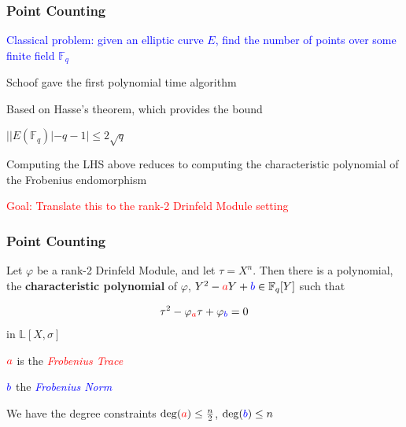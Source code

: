 \documentclass{beamer}
\newcommand{\blue}{\textcolor{blue}}
\newcommand{\red}{\textcolor{red}}
\newcommand{\spa}{\vspace{0.2cm}}
\begin{document}

\begin{frame}
\frametitle{Point Counting}


 \blue{Classical problem: given an elliptic curve $E$, find the number of points over some finite field $\mathbb{F}_q$} 
 
 \spa
 
Schoof gave the first polynomial time algorithm

\spa

Based on Hasse's theorem, which provides the bound 

\centerline {$ | |E(\mathbb{F}_q)| - q - 1  | \leq 2 \sqrt{q} $}

\spa

 Computing the LHS above reduces to computing the characteristic polynomial of the Frobenius endomorphism
 
 \spa
\red{Goal: Translate this to the rank-2 Drinfeld Module setting}


\end{frame}









\begin{frame}
\frametitle{Point Counting}

\begin{theorem}[Gekeler, 1991]
Let $\varphi$ be a rank-2 Drinfeld Module, and let $\tau = X^n$. Then there is a polynomial, the \textbf{characteristic polynomial} of $\varphi$,  $Y^2 - \red{a}Y +\blue{b} \in \mathbb{F}_q[Y]$ such that

\[\tau^2 -\varphi_{\red{a}}\tau + \varphi_{\blue{b}} = 0\]
in $\mathbb{L}[X,\sigma]$
\end{theorem}

\spa

$\red{a}$ is the \red{\textit{Frobenius Trace}}

\spa

$\blue{b}$ the \blue{\textit{Frobenius Norm}}

\spa

We have the degree constraints $\deg(\red{a}) \leq \frac{n}{2}$, $\deg(\blue{b}) \leq n$


\end{frame}
\end{document}
